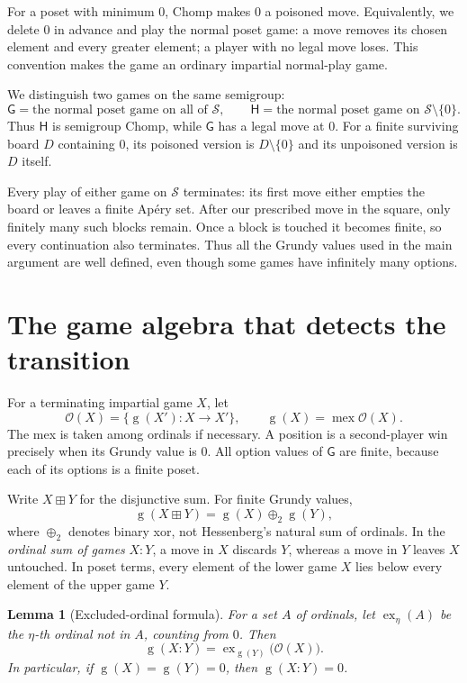 \documentclass[11pt,letterpaper]{article}
\numberwithin{equation}{section}
\newtheorem{lemma}[theorem]{Lemma}
\theoremstyle{definition}
\newcommand{\Sg}{\mathcal S}
\newcommand{\Gr}{\operatorname{g}}
\newcommand{\mex}{\operatorname{mex}}
\newcommand{\ex}{\operatorname{ex}}
\newcommand{\Opt}{\mathcal O}
\newcommand{\ps}{\mathbin{\boxplus}}
\newcommand{\xo}{\mathbin{\oplus_{\!2}}}
\renewcommand{\Game}{\mathsf G}
\newcommand{\Poison}{\mathsf H}
\begin{document}
For a poset with minimum $0$, Chomp makes $0$ a poisoned move. Equivalently,
we delete $0$ in advance and play the normal poset game: a move removes its
chosen element and every greater element; a player with no legal move loses.
This convention makes the game an ordinary impartial normal-play game.

We distinguish two games on the same semigroup:
\[
 \Game=\text{the normal poset game on all of }\Sg,
 \qquad
 \Poison=\text{the normal poset game on }\Sg\setminus\{0\}.
\]
Thus $\Poison$ is semigroup Chomp, while $\Game$ has a legal move at $0$.
For a finite surviving board $D$ containing $0$, its poisoned version is
$D\setminus\{0\}$ and its unpoisoned version is $D$ itself.

Every play of either game on $\Sg$ terminates: its first move either empties
the board or leaves a finite Ap\'ery set. After our prescribed move in the
square, only finitely many such blocks remain. Once a block is touched it
becomes finite, so every continuation also terminates. Thus all the Grundy
values used in the main argument are well defined, even though some games
have infinitely many options.

\section{The game algebra that detects the transition}
\label{sec:algebra}

For a terminating impartial game $X$, let
\[
 \Opt(X)=\{\Gr(X'):X\longrightarrow X'\},\qquad
 \Gr(X)=\mex\Opt(X).
\]
The mex is taken among ordinals if necessary. A position is a second-player
win precisely when its Grundy value is $0$. All option values of $\Game$
are finite, because each of its options is a finite poset.

Write $X\ps Y$ for the disjunctive sum. For finite Grundy values,
\[
 \Gr(X\ps Y)=\Gr(X)\xo\Gr(Y),
\]
where $\xo$ denotes binary xor, not Hessenberg's natural sum of ordinals.
In the \emph{ordinal sum of games} $X:Y$, a move in $X$ discards $Y$, whereas
a move in $Y$ leaves $X$ untouched. In poset terms, every element of the
lower game $X$ lies below every element of the upper game $Y$.

\begin{lemma}[Excluded-ordinal formula]\label{lem:ordinal-sum}
For a set $A$ of ordinals, let $\ex_\eta(A)$ be the $\eta$-th ordinal not
in $A$, counting from $0$. Then
\begin{equation}\label{eq:ordinal-sum}
 \Gr(X:Y)=\ex_{\Gr(Y)}\bigl(\Opt(X)\bigr).
\end{equation}
In particular, if $\Gr(X)=\Gr(Y)=0$, then $\Gr(X:Y)=0$.
\end{lemma}
\end{document}

